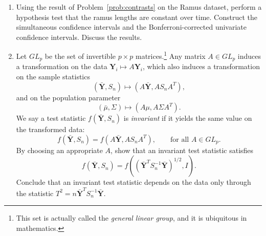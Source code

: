 \documentclass[12pt]{paper}
\numberwithin{equation}{section} %
\numberwithin{figure}{section} %
\numberwithin{table}{section} %
\begin{document}
\begin{enumerate}
	\vspace{1.5cm}\item Using the result of Problem~\ref{prob:contrasts} on the Ramus dataset, perform a hypothesis test that the ramus lengths are constant over time. Construct the simultaneous confidence intervals and the Bonferroni-corrected univariate confidence intervals. Discuss the results. 
	
	\vspace{1.5cm}\item Let $GL_p$ be the set of invertible $p\times p$ matrices.\footnote{This set is actually called the \emph{general linear group}, and it is ubiquitous in mathematics.} Any matrix $A\in GL_p$ induces a transformation on the data $\mathbf{Y}_i \mapsto A\mathbf{Y}_i$, which also induces a transformation on the sample statistics
	$$ (\bar{\mathbf{Y}}, S_n) \mapsto (A\bar{\mathbf{Y}}, AS_n A^T),$$
	and on the population parameter
	$$ (\bar\mu, \Sigma) \mapsto (A\mu, A\Sigma A^T).$$
	We say a test statistic $f(\bar{\mathbf{Y}}, S_n)$ is \emph{invariant} if it yields the same value on the transformed data:
	$$ f(\bar{\mathbf{Y}}, S_n) = f(A\bar{\mathbf{Y}}, AS_n A^T), \qquad\mbox{for all } A\in GL_p.$$
	By choosing an appropriate $A$, show that an invariant test statistic satisfies
	$$ f(\bar{\mathbf{Y}}, S_n) = f((\bar{\mathbf{Y}}^T S_n^{-1}\bar{\mathbf{Y}})^{1/2}, I).$$
	Conclude that an invariant test statistic depends on the data only through the statistic $T^2 = n\bar{\mathbf{Y}}^T S_n^{-1}\bar{\mathbf{Y}}$.
\end{enumerate}
\end{document}
